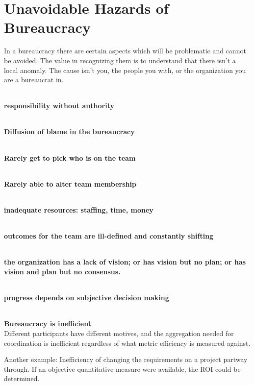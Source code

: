 \section{Unavoidable Hazards of Bureaucracy\label{sec:unavoidable_hazards}}

In a bureaucracy there are certain aspects which will be problematic and cannot be avoided. The value in recognizing them is to understand that there isn't a local anomaly. The cause isn't you, the people you with, or the organization you are a bureaucrat in. 

\ \\

\textbf{responsibility without authority}

\ \\

\textbf{Diffusion of blame in the bureaucracy}

\ \\

\textbf{Rarely get to pick who is on the team}

\ \\

\textbf{Rarely able to alter team membership}

\ \\

\textbf{inadequate resources: staffing, time, money}

\ \\

\textbf{outcomes for the team are ill-defined and constantly shifting}

\ \\

\textbf{the organization has a lack of vision; or has vision but no plan; or has vision and plan but no consensus.}

\ \\

\textbf{progress depends on subjective decision making}

\ \\


\textbf{Bureaucracy is inefficient}\\
Different participants have different motives, and the aggregation needed for coordination is inefficient regardless of what metric efficiency is measured against.

Another example: Inefficiency of changing the requirements on a project partway through. If an objective quantitative measure were available, the ROI could be determined. 

